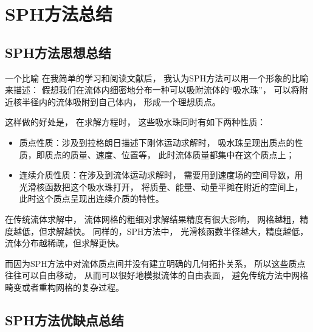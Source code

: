 \section{SPH方法总结}


\subsection{SPH方法思想总结}

\begin{frame}
\begin{block}{一个比喻}
    在我简单的学习和阅读文献后，
    我认为SPH方法可以用一个形象的比喻来描述：
    假想我们在流体内细密地分布一种可以吸附流体的“吸水珠”，
    可以将附近核半径内的流体吸附到自己体内，
    形成一个理想质点。

    这样做的好处是，
    在求解方程时，
    这些吸水珠同时有如下两种性质：
    \begin{itemize}
        \item 质点性质：涉及到拉格朗日描述下刚体运动求解时，
        吸水珠呈现出质点的性质，即质点的质量、速度、位置等，
        此时流体质量都集中在这个质点上；
        \item 连续介质性质：在涉及到流体运动求解时，
        需要用到速度场的空间导数，用光滑核函数把这个吸水珠打开，
        将质量、能量、动量平摊在附近的空间上，
        此时这个质点呈现出连续介质的特性。
    \end{itemize}

    在传统流体求解中，
    流体网格的粗细对求解结果精度有很大影响，
    网格越粗，精度越低，但求解越快。
    同样的，SPH方法中，
    光滑核函数半径越大，精度越低，流体分布越稀疏，但求解更快。

    而因为SPH方法中对流体质点间并没有建立明确的几何拓扑关系，
    所以这些质点往往可以自由移动，
    从而可以很好地模拟流体的自由表面，
    避免传统方法中网格畸变或者重构网格的复杂过程。
\end{block}
\end{frame}

\subsection{SPH方法优缺点总结}

